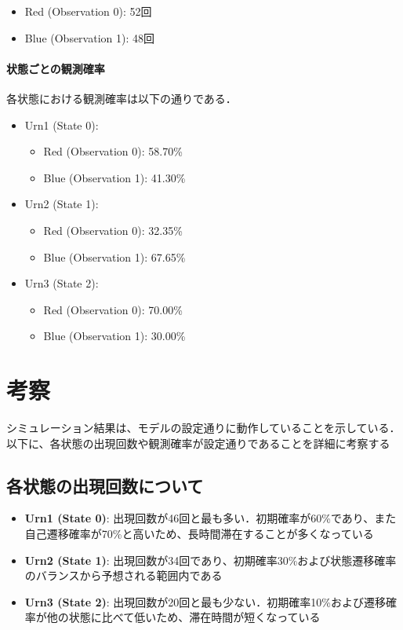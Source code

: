 \documentclass[dvipdfmx,titlepage,a4j]{jsarticle}
\begin{document}
\begin{itemize}
    \item Red (Observation 0): 52回
    \item Blue (Observation 1): 48回
\end{itemize}

\paragraph{状態ごとの観測確率}
各状態における観測確率は以下の通りである．

\begin{itemize}
    \item Urn1 (State 0):
          \begin{itemize}
              \item Red (Observation 0): 58.70\%
              \item Blue (Observation 1): 41.30\%
          \end{itemize}
    \item Urn2 (State 1):
          \begin{itemize}
              \item Red (Observation 0): 32.35\%
              \item Blue (Observation 1): 67.65\%
          \end{itemize}
    \item Urn3 (State 2):
          \begin{itemize}
              \item Red (Observation 0): 70.00\%
              \item Blue (Observation 1): 30.00\%
          \end{itemize}
\end{itemize}

\section{考察}

シミュレーション結果は、モデルの設定通りに動作していることを示している．以下に、各状態の出現回数や観測確率が設定通りであることを詳細に考察する

\subsection{各状態の出現回数について}

\begin{itemize}
    \item \textbf{Urn1 (State 0)}: 出現回数が46回と最も多い．初期確率が60\%であり、また自己遷移確率が70\%と高いため、長時間滞在することが多くなっている
    \item \textbf{Urn2 (State 1)}: 出現回数が34回であり、初期確率30\%および状態遷移確率のバランスから予想される範囲内である
    \item \textbf{Urn3 (State 2)}: 出現回数が20回と最も少ない．初期確率10\%および遷移確率が他の状態に比べて低いため、滞在時間が短くなっている
\end{itemize}
\end{document}
